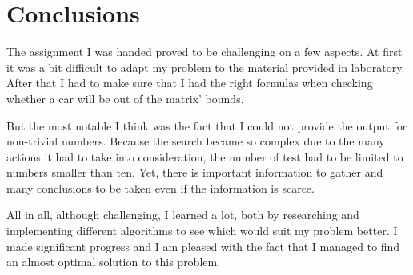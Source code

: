 \documentclass{article}
\begin{document}
\begin{figure}[H]
    \centering
    \begin{multicols}{2}
        \centering
\end{multicols}
\end{figure}


\section{Conclusions}
The assignment I was handed proved to be challenging on a few aspects. At first it was a bit difficult to adapt my problem to the material provided in laboratory. After that I had to make sure that I had the right formulas when checking whether a car will be out of the matrix' bounds. 

But the most notable I think was the fact that I could not provide the output for non-trivial numbers. Because the search became so complex due to the many actions it had to take into consideration, the number of test had to be limited to numbers smaller than ten. Yet, there is important information to gather and many conclusions to be taken even if the information is scarce.

All in all, although challenging, I learned a lot, both by researching and implementing different algorithms to see which would suit my problem better. I made significant progress and I am pleased with the fact that I managed to find an almost optimal solution to this problem.
\end{document}

